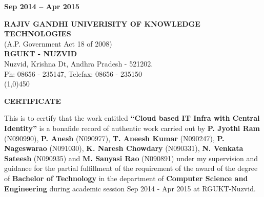 \documentclass[12pt]{report}
\begin{document}
\begin{titlepage}
\begin{center}
\normalsize
\vfill
%
%

\textbf{Sep 2014 -- Apr 2015 }

\end{center}
\end{titlepage}


  
\thispagestyle{empty}


\begin{center}
  \textbf{RAJIV GANDHI UNIVERISITY OF KNOWLEDGE TECHNOLOGIES}  \\
 	(A.P. Government Act 18 of 2008) \\
 	\textbf{RGUKT - NUZVID} \\
 	Nuzvid, Krishna Dt, Andhra Pradesh - 521202. \\
 	Ph: 08656 - 235147, Telefax: 08656 - 235150 \\
 	\line(1,0){450}
\end{center}


\begin{center}

\Large
\textbf{CERTIFICATE} \\
\end{center}
\normalsize
\hspace{0.5cm} This is to certify that the work entitled \textbf{``Cloud based IT Infra with Central Identity''} is a bonafide record of authentic work carried out by \textbf{P. Jyothi Ram} (N090990), \textbf{P. Anesh} (N090977), \textbf{T. Aneesh Kumar} (N090247), \textbf{P. Nageswarao} (N091030), \textbf{K. Naresh Chowdary} (N090331), \textbf{N. Venkata Sateesh} (N090935) and  \textbf{M. Sanyasi Rao} (N090891)  under my supervision and guidance for the partial fulfillment of the requirement of the award of the degree of \textbf{Bachelor of Technology} in the department of \textbf{Computer Science and Engineering} during academic session Sep 2014 - Apr 2015 at RGUKT-Nuzvid. \newline
\end{document}
